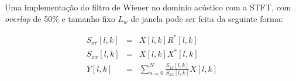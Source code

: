 Uma implementação do filtro de Wiener no domínio acústico com a STFT, com 
\textit{overlap} de 50\% e tamanho fixo $L_w$ de janela pode ser feita da seguinte forma:

 \begin{eqnarray}
    S_{xr}[l, k] &=& X[l, k] R^{*}[l, k]\\
    S_{xx}[l, k] &=& X[l, k] X^{*}[l, k]\\
    Y[l,k] &=& \sum_{n = 0}^N\frac{S_{xr}[l, k]}{S_{xx}[l, k]} X[l, k]
 \end{eqnarray}



